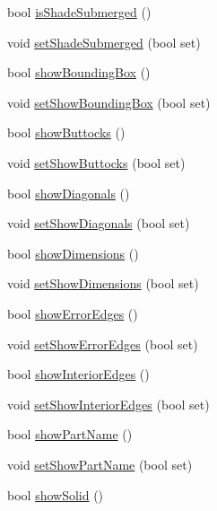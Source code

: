 \begin{DoxyCompactItemize}
\item 
bool \hyperlink{classShipCAD_1_1DevelopedPatch_a3c9a16c7f2453d62b50e8ea40f9571e2}{is\+Shade\+Submerged} ()
\item 
void \hyperlink{classShipCAD_1_1DevelopedPatch_afd4cfdc14036055e13c1fcc2eaaaabda}{set\+Shade\+Submerged} (bool set)
\item 
bool \hyperlink{classShipCAD_1_1DevelopedPatch_a456f6b0ba40c8a6be86f81c45c9062c4}{show\+Bounding\+Box} ()
\item 
void \hyperlink{classShipCAD_1_1DevelopedPatch_a6adb505976cf4f01beba5774e2fa882b}{set\+Show\+Bounding\+Box} (bool set)
\item 
bool \hyperlink{classShipCAD_1_1DevelopedPatch_a3563a7434a34b0a46bb7ee0413851179}{show\+Buttocks} ()
\item 
void \hyperlink{classShipCAD_1_1DevelopedPatch_ab406b4350137fcf93cca71b2c05c44be}{set\+Show\+Buttocks} (bool set)
\item 
bool \hyperlink{classShipCAD_1_1DevelopedPatch_abb80ca80bb26c6d44995161517a34c2f}{show\+Diagonals} ()
\item 
void \hyperlink{classShipCAD_1_1DevelopedPatch_a9664cee0660a8e5d2ac41ff9056cc434}{set\+Show\+Diagonals} (bool set)
\item 
bool \hyperlink{classShipCAD_1_1DevelopedPatch_acab796afd80347da0b839511e0287fb1}{show\+Dimensions} ()
\item 
void \hyperlink{classShipCAD_1_1DevelopedPatch_abb6ef0e0db4819e5e70b6b1066f79736}{set\+Show\+Dimensions} (bool set)
\item 
bool \hyperlink{classShipCAD_1_1DevelopedPatch_aa6ab97dde9f6152f57b501b527cf9b34}{show\+Error\+Edges} ()
\item 
void \hyperlink{classShipCAD_1_1DevelopedPatch_a1e69c1d9755df1b77757bfd07b39f16a}{set\+Show\+Error\+Edges} (bool set)
\item 
bool \hyperlink{classShipCAD_1_1DevelopedPatch_adb0eefd6031d26224f17f7e8ce32b0a5}{show\+Interior\+Edges} ()
\item 
void \hyperlink{classShipCAD_1_1DevelopedPatch_ab580d449a859b81adfd2542ceea0464d}{set\+Show\+Interior\+Edges} (bool set)
\item 
bool \hyperlink{classShipCAD_1_1DevelopedPatch_a0ddb0069d07d2a27e709dc1f5c76275b}{show\+Part\+Name} ()
\item 
void \hyperlink{classShipCAD_1_1DevelopedPatch_a9ece9e74aa65a84117568b0f0c74ef0b}{set\+Show\+Part\+Name} (bool set)
\item 
bool \hyperlink{classShipCAD_1_1DevelopedPatch_a244492f9f03b465b7573fd7ee0556ad8}{show\+Solid} ()

\end{DoxyCompactItemize}
